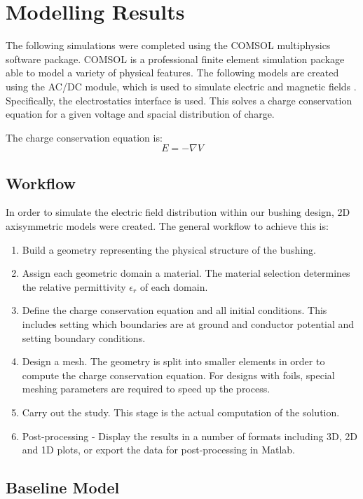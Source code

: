 
\section{Modelling Results}
The following simulations were completed using the COMSOL multiphysics software package.
COMSOL is a professional finite element simulation package able to model a variety of physical features.
The following models are created using the AC/DC module, which is used to simulate electric and magnetic fields \cite{}.
Specifically, the electrostatics interface is used. 
This solves a charge conservation equation for a given voltage and spacial distribution of charge.

The charge conservation equation is:
\begin{equation}
E = -\nabla V
\end{equation}

\subsection{Workflow}
In order to simulate the electric field distribution within our bushing design, 2D axisymmetric models were created. The general workflow to achieve this is:
\begin{enumerate}
\item Build a geometry representing the physical structure of the bushing.
\item Assign each geometric domain a material. The material selection determines the relative permittivity $\epsilon_r$ of each domain.
\item Define the charge conservation equation and all initial conditions. This includes setting which boundaries are at ground and conductor potential and setting boundary conditions.
\item Design a mesh. The geometry is split into smaller elements in order to compute the charge conservation equation. For designs with foils, special meshing parameters are required to speed up the process.
\item Carry out the study. This stage is the actual computation of the solution.
\item Post-processing - Display the results in a number of formats including 3D, 2D and 1D plots, or export the data for post-processing in Matlab.
\end{enumerate}


\subsection{Baseline Model}


